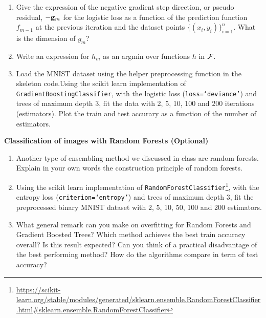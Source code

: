\documentclass{article}
\newcommand{\nyuparagraph}[1]{\vspace{0.3cm}\textcolor{nyupurple}{\bf \large #1}\\}
\theoremstyle{plain}
\theoremstyle{definition}
\begin{document}
\begin{enumerate}
  \setcounter{enumi}{\value{saveenum}}
  
\item Give the expression of the negative gradient step direction, or pseudo residual, $-{\bf g}_{m}$ for the logistic loss as a function of the prediction function $f_{m-1}$ at the previous iteration and the dataset points $\{(x_i, y_i)\}_{i=1}^n$. What is the dimension of $g_{m}$?\\

\item Write an expression for $h_{m}$ as an argmin over functions $h$ in $\mathcal{F}$.\\

  
\item Load the MNIST dataset using the helper preprocessing function in the skeleton code.Using the scikit learn implementation of \texttt{GradientBoostingClassifier}, with the logistic loss (\texttt{loss=`deviance'}) and trees of maximum depth 3, fit the data with 2, 5, 10, 100 and 200 iterations (estimators). Plot the train and test accurary as a function of the number of estimators.\\


\setcounter{saveenum}{\value{enumi}}
\end{enumerate}

\nyuparagraph{Classification of images with Random Forests (Optional)}
\begin{enumerate}
  \setcounter{enumi}{\value{saveenum}}
\item Another type of ensembling method we discussed in class are random forests. Explain in your own words the construction principle of random forests.\\

\item Using the scikit learn implementation of \texttt{RandomForestClassifier}\footnote{\url{https://scikit-learn.org/stable/modules/generated/sklearn.ensemble.RandomForestClassifier.html\#sklearn.ensemble.RandomForestClassifier}},
with the entropy loss (\texttt{criterion=`entropy'}) and trees of maximum depth 3, fit the preprocessed binary MNIST dataset with 2, 5, 10, 50, 100 and 200 estimators.\\

\item What general remark can you make on overfitting for Random Forests and Gradient Boosted Trees? Which method achieves the best train accuracy overall? Is this result expected? 
Can you think of a practical disadvantage of the best performing method? How do the algorithms compare in term of test accuracy? \\
\setcounter{saveenum}{\value{enumi}}
\end{enumerate}
\end{document}
